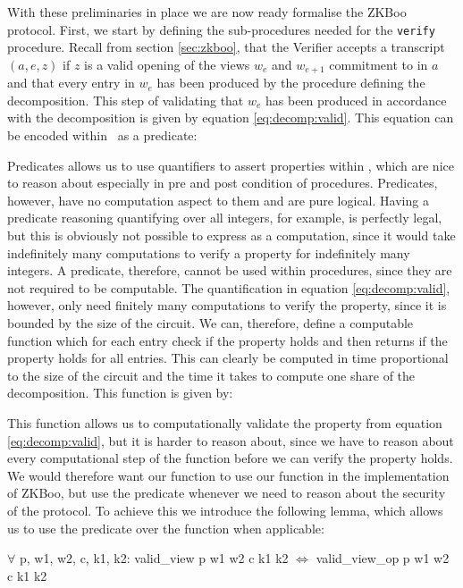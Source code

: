 With these preliminaries in place we are now ready formalise the ZKBoo protocol.
First, we start by defining the sub-procedures needed for the \texttt{verify}
procedure. Recall from section \ref{sec:zkboo}, that the Verifier accepts a
transcript $(a,e,z)$ if $z$ is a valid opening of the views $w_{e}$ and
$w_{e+1}$ commitment to in $a$ and that every entry in $w_{e}$ has been produced
by the procedure defining the decomposition. This step of validating that
$w_{e}$ has been produced in accordance with the decomposition is given 
by equation \ref{eq:decomp:valid}.
%
This equation can be encoded within \easycrypt\ as a predicate:


Predicates allows us to use quantifiers to assert properties within \easycrypt , which are nice to
reason about especially in pre and post condition of procedures. Predicates,
however, have no computation aspect to them and are pure logical.
Having a predicate reasoning quantifying over all integers, for example, is
perfectly legal, but this is obviously not possible to express as a computation,
since it would take indefinitely many computations to verify a property for
indefinitely many integers.
A predicate, therefore, cannot be used within procedures, since they are not
required to be computable.
The quantification in equation \ref{eq:decomp:valid}, however, only need
finitely many computations to verify the property, since it is bounded by the
size of the circuit. We can, therefore, define a computable function which for
each entry check if the property holds and then returns if the property holds
for all entries. This can clearly be computed in time proportional to the size
of the circuit and the time it takes to compute one share of the decomposition.
This function is given by:


This function allows us to computationally validate the property from equation
\ref{eq:decomp:valid}, but it is harder to reason about, since we have
to reason about every computational step of the function before we can verify
the property holds. We would therefore want our function to use our function in
the implementation of ZKBoo, but use the predicate whenever we need to reason
about the security of the protocol. To achieve this we introduce the following
lemma, which allows us to use the predicate over the function when applicable:
\begin{lemma}
  $\forall$ p, w1, w2, c, k1, k2:
  valid\_view p w1 w2 c k1 k2 $\iff$ valid\_view\_op p w1 w2 c k1 k2
\end{lemma}

